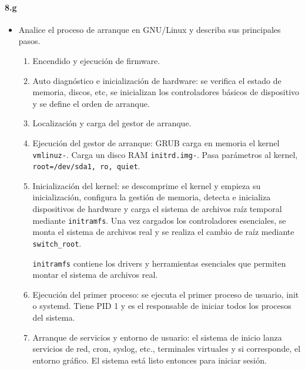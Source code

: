 \documentclass[10pt,a4paper]{paper}
\begin{document}
	
	\paragraph{8.g}
	\begin{itemize}
		\item Analice el proceso de arranque en GNU/Linux y describa sus principales
		pasos.
		
		\begin{enumerate}
			\item Encendido y ejecución de firmware.
			
			\item Auto diagnóstico e inicialización de hardware: se verifica el estado de
			memoria, discos, etc, se inicializan los controladores básicos de dispositivo y
			se define el orden de arranque.
			
			\item Localización y carga del gestor de arranque.
			
			\item Ejecución del gestor de arranque: GRUB carga en memoria el kernel
			\texttt{vmlinuz-}. Carga un disco RAM \texttt{initrd.img-}. Pasa parámetros al
			kernel, \texttt{root=/dev/sda1, ro, quiet}.
			
			\item Inicialización del kernel: se descomprime el kernel y empieza su
			inicialización, configura la gestión de memoria, detecta e inicializa
			dispositivos de hardware y carga el sistema de archivos raíz temporal mediante
			\texttt{initramfs}. Una vez cargados los controladores esenciales, se monta el
			sistema de archivos real y se realiza el cambio de raíz mediante
			\texttt{switch\_root}.
			
			
			\texttt{initramfs} contiene los drivers y herramientas esenciales que permiten
			montar el sistema de archivos real.
			
			\item Ejecución del primer proceso: se ejecuta el primer proceso de usuario,
			init o systemd. Tiene PID 1 y es el responsable de iniciar todos los procesos
			del sistema.
			
			\item Arranque de servicios y entorno de usuario: el sistema de inicio lanza
			servicios de red, cron, syslog, etc., terminales virtuales y si corresponde, el
			entorno gráfico. El sistema está listo entonces para iniciar sesión.
			
		\end{enumerate}
		
	\end{itemize}
	
\end{document}
